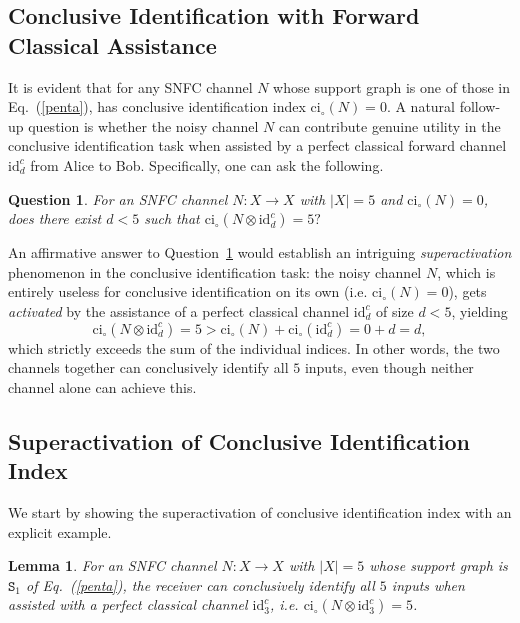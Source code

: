 \documentclass[12pt,a4paper]{article}
\newtheorem{lemma}{Lemma}
\newtheorem{question}{Question}
\begin{document}
\subsection{Conclusive Identification with Forward Classical Assistance}

It is evident that for any SNFC channel $N$ whose support graph is one of those in Eq.~(\ref{penta}), has conclusive identification index $\mathrm{ci}_\circ(N) = 0$. A natural follow-up question is whether the noisy channel $N$ can contribute genuine utility in the conclusive identification task when assisted by a perfect classical forward channel $\mathrm{id}^c_d$ from Alice to Bob. Specifically, one can ask the following.
\begin{question}\label{qu2}
For an SNFC channel $N : X \to X$ with $|X| = 5$ and $\mathrm{ci}_\circ(N) = 0$, does there exist $d < 5$ such that $\mathrm{ci}_\circ(N \otimes \mathrm{id}^c_d) = 5?$
\end{question}

\noindent An affirmative answer to Question~\ref{qu2} would establish an intriguing \emph{superactivation} phenomenon in the conclusive identification task: the noisy channel $N$, which is entirely useless for conclusive identification on its own (i.e. $\mathrm{ci}_\circ(N) = 0$), gets \emph{activated} by the assistance of a perfect classical channel $\mathrm{id}^c_d$ of size $d < 5$, yielding
\begin{equation*}
\mathrm{ci}_\circ(N \otimes \mathrm{id}^c_d) = 5 > \mathrm{ci}_\circ(N) + \mathrm{ci}_\circ(\mathrm{id}^c_d)  = 0 + d = d,
\end{equation*}
which strictly exceeds the sum of the individual indices. In other words, the two channels together can conclusively identify all $5$ inputs, even though neither channel alone can achieve this.

\subsection{Superactivation of Conclusive Identification Index}
We start by showing the superactivation of conclusive identification index with an explicit example. 

\begin{lemma}\label{lemma1}
For an SNFC channel $N : X \to X$ with $|X| = 5$ whose support graph is $\mathtt{S}_1$ of Eq.~(\ref{penta}), the receiver can conclusively identify all $5$ inputs when assisted with a perfect classical channel $\mathrm{id}^c_3$, i.e. $\mathrm{ci}_\circ(N \otimes \mathrm{id}^c_3) = 5$.
\end{lemma}
\end{document}
